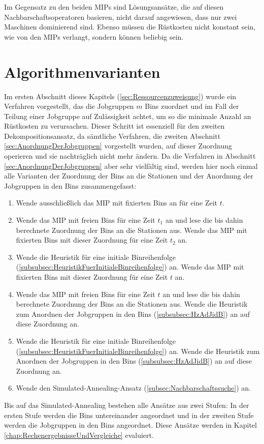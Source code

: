 \documentclass{scrreprt}
\begin{document}
Im Gegensatz zu den beiden MIPs sind Lösungsansätze, die auf diesen Nachbarschaftsoperatoren basieren, nicht darauf angewiesen, 
dass nur zwei Maschinen dominierend sind. Ebenso müssen die Rüstkosten nicht konstant sein, wie von den MIPs verlangt, sondern können beliebig sein.


\section{Algorithmenvarianten}
\label{sec:Algorithmenvarianten}
Im ersten Abschnitt dieses Kapitels (\ref{sec:Ressourcenzuweisung}) wurde ein Verfahren vorgestellt, 
das die Jobgruppen $m$ Bins zuordnet und im Fall der Teilung einer Jobgruppe auf Zulässigkeit achtet,
um so die minimale Anzahl an Rüstkosten zu verursachen.
Dieser Schritt ist essenziell für den zweiten Dekompositionsansatz, da sämtliche Verfahren, die zweiten Abschnitt \ref{sec:AnordnungDerJobgruppen} vorgestellt wurden,
auf dieser Zuordnung operieren und sie nachträglich nicht mehr ändern.
Da die Verfahren in Abschnitt \ref{sec:AnordnungDerJobgruppen} aber sehr vielfältig sind, 
werden hier noch einmal alle Varianten der Zuordnung der Bins an die Stationen und der Anordnung der Jobgruppen in den Bins zusammengefasst:
\begin{enumerate}
    \item Wende ausschließlich das MIP mit fixierten Bins an für eine Zeit $t$.%
    \item Wende das MIP mit freien Bins für eine Zeit $t_1$ an und lese die bis dahin berechnete Zuordnung der Bins an die Stationen aus.
        Wende das MIP mit fixierten Bins mit dieser Zuordnung für eine Zeit $t_2$ an.
    \item Wende die Heuristik für eine initiale Binreihenfolge (\ref{subsubsec:HeuristikFuerInitialeBinreihenfolge}) an.
        Wende das MIP mit fixierten Bins mit dieser Zuordnung für eine Zeit $t$ an.
    \item Wende das MIP mit freien Bins für eine Zeit $t$ an und lese die bis dahin berechnete Zuordnung der Bins an die Stationen aus.
        Wende die Heuristik zum Anordnen der Jobgruppen in den Bins (\ref{subsubsec:HzAdJidB}) an auf diese Zuordnung an.
    \item Wende die Heuristik für eine initiale Binreihenfolge (\ref{subsubsec:HeuristikFuerInitialeBinreihenfolge}) an.
        Wende die Heuristik zum Anordnen der Jobgruppen in den Bins (\ref{subsubsec:HzAdJidB}) an auf diese Zuordnung an.
    \item Wende den Simulated-Annealing-Ansatz (\ref{subsec:Nachbarschaftssuche}) an.
\end{enumerate}
Bis auf das Simulated-Annealing bestehen alle Ansätze aus zwei Stufen: 
In der ersten Stufe werden die Bins untereinander angeordnet und in der zweiten Stufe werden die Jobgruppen in den Bins angeordnet.
Diese Ansätze werden in Kapitel \ref{chap:RechenergebnisseUndVergleiche} evaluiert.
\end{document}
